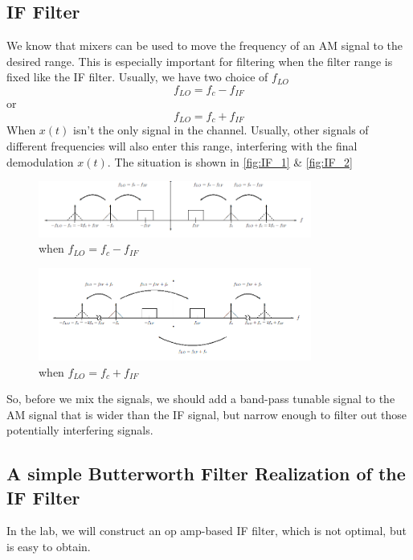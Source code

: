 \documentclass[a4paper]{article}
\begin{document}
    \subsection{IF Filter}
    We know that mixers can be used to move the frequency of an AM signal to the desired range. This is especially important for filtering when the filter range is fixed like the IF filter. Usually, we have two choice of $f_{LO}$
    \begin{equation*}
        f_{LO} = f_c - f_{IF}
    \end{equation*}
    or 
    \begin{equation*}
        f_{LO} = f_c + f_{IF}
    \end{equation*}
    When $x(t)$ isn't the only signal in the channel. Usually, other signals of different frequencies will also enter this range, interfering with the final demodulation $x(t)$. The situation is shown in \autoref{fig:IF_1} \& \autoref{fig:IF_2}
    \begin{figure}[h]
        \centering
        \includegraphics[width=0.8\textwidth, trim={0 0 0 0cm}, clip]{band1.png}
        \caption{when $f_{LO} = f_c - f_{IF}$}
        \label{fig:IF_1}
    \end{figure}
    \begin{figure}[h]
        \centering
        \includegraphics[width=0.8\textwidth, trim={0 0 0 0cm}, clip]{band2.png}
        \caption{when $f_{LO} = f_c + f_{IF}$}
        \label{fig:IF_2}
    \end{figure}

    So, before we mix the signals, we should add a band-pass tunable signal to the AM signal that is wider than the IF signal, but narrow enough to filter out those potentially interfering signals.

    \subsection{A simple Butterworth Filter Realization of the IF Filter}
    In the lab, we will construct an op amp-based IF filter, which is not optimal, but is easy to obtain.
\end{document}
